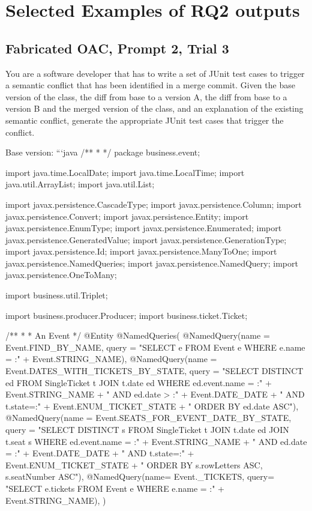 \section{Selected Examples of RQ2 outputs}

\subsection{Fabricated OAC, Prompt 2, Trial 3}

\begin{prompt}
  You are a software developer that has to write a set of JUnit test cases to trigger a semantic conflict that has been identified in a merge commit. 
  Given the base version of the class, the diff from base to a version A, the diff from base to a version B and the merged version of the class, and an explanation of the existing semantic conflict, generate the appropriate JUnit test cases that trigger the conflict.
  
  Base version:
  ```java
  /**
   * 
   */
  package business.event;
  
  
  
  import java.time.LocalDate;
  import java.time.LocalTime;
  import java.util.ArrayList;
  import java.util.List;
  
  import javax.persistence.CascadeType;
  import javax.persistence.Column;
  import javax.persistence.Convert;
  import javax.persistence.Entity;
  import javax.persistence.EnumType;
  import javax.persistence.Enumerated;
  import javax.persistence.GeneratedValue;
  import javax.persistence.GenerationType;
  import javax.persistence.Id;
  import javax.persistence.ManyToOne;
  import javax.persistence.NamedQueries;
  import javax.persistence.NamedQuery;
  import javax.persistence.OneToMany;
  
  import business.util.Triplet;
  
  import business.producer.Producer;
  import business.ticket.Ticket;
  
  /**
   * 
   * An Event
   */
  @Entity
  @NamedQueries({
      @NamedQuery(name = Event.FIND_BY_NAME, query = "SELECT e FROM Event e WHERE e.name = :" + Event.STRING_NAME),
      @NamedQuery(name = Event.DATES_WITH_TICKETS_BY_STATE, query = "SELECT DISTINCT ed FROM SingleTicket t JOIN t.date ed WHERE ed.event.name = :"
          + Event.STRING_NAME + " AND ed.date > :" + Event.DATE_DATE
          + " AND t.state=:" + Event.ENUM_TICKET_STATE + " ORDER BY ed.date ASC"),
      @NamedQuery(name = Event.SEATS_FOR_EVENT_DATE_BY_STATE, query = "SELECT DISTINCT s FROM SingleTicket t JOIN t.date ed JOIN t.seat s WHERE ed.event.name = :"
          + Event.STRING_NAME + " AND ed.date = :" + Event.DATE_DATE
          + " AND t.state=:" + Event.ENUM_TICKET_STATE + " ORDER BY s.rowLetters ASC, s.seatNumber ASC"),
      @NamedQuery(name= Event._TICKETS, query= "SELECT e.tickets FROM Event e WHERE e.name = :" + Event.STRING_NAME),
      })
  

\end{prompt}
